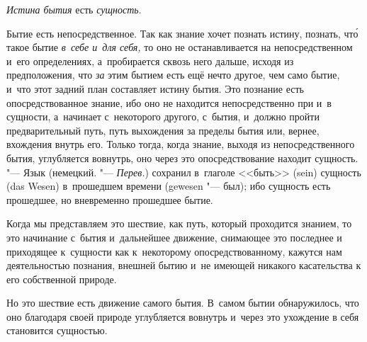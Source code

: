 {\em Истина бытия} есть {\em сущность}.

Бытие есть непосредственное. Так как знание хочет познать истину, познать,
чт\'{о} такое бытие {\em в~себе и~для себя,} то оно не
останавливается на непосредственном и~его определениях, а~пробирается
сквозь него дальше, исходя из предположения, что
{\em за} этим бытием есть ещё нечто другое, чем само
бытие, и~что этот задний план составляет истину бытия. Это познание есть
опосредствованное знание, ибо оно не находится непосредственно при и~в
сущности, а~начинает с~некоторого другого, с~бытия, и~должно пройти
предварительный путь, путь выхождения за пределы бытия или, вернее,
вхождения внутрь его. Только тогда, когда знание, выходя из
непосредственного бытия, углубляется вовнутрь, оно через это
опосредствование находит сущность. "--- Язык (немецкий. "--- {\em Перев.})
сохранил в~глаголе <<быть>> (sein) сущность (das Wesen) в~прошедшем времени
(gewesen "--- был); ибо сущность есть прошедшее, но вневременно прошедшее
бытие.

Когда мы представляем это шествие, как путь, который проходится знанием, то
это начинание с~бытия и~дальнейшее движение, снимающее это последнее и
приходящее к~сущности как к~некоторому опосредствованному, кажутся нам
деятельностью познания, внешней бытию и~не имеющей никакого касательства к
его собственной природе.

Но это шествие есть движение самого бытия. В~самом бытии обнаружилось, что
оно благодаря своей природе углубляется вовнутрь и~через это ухождение в
себя становится сущностью.

